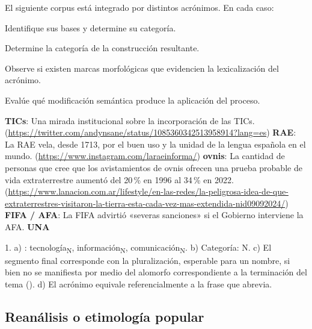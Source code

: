 \begin{ejercicio}\label{ej:04-acronimos}
El siguiente corpus está integrado por distintos acrónimos. En cada caso:

\begin{consignas}
  \item Identifique sus bases y determine su categoría.
  \item Determine la categoría de la construcción resultante.
  \item Observe si existen marcas morfológicas que evidencien la lexicalización
        del acrónimo.
  \item Evalúe qué modificación semántica produce la aplicación del proceso.
\end{consignas}

\begin{exe}
  \ex \textbf{TICs}: Una mirada institucional sobre la incorporación de las TICs.
      (\url{https://twitter.com/andynsane/status/1085360342513958914?lang=es})
  \ex \textbf{RAE}: La RAE vela, desde 1713, por el buen uso y la unidad de la
      lengua española en el mundo. (\url{https://www.instagram.com/laraeinforma/})
  \ex \textbf{ovnis}: La cantidad de personas que cree que los avistamientos de
      ovnis ofrecen una prueba probable de vida extraterrestre aumentó del 20\,\%
      en 1996 al 34\,\% en 2022.
      (\url{https://www.lanacion.com.ar/lifestyle/en-las-redes/la-peligrosa-idea-de-que-extraterrestres-visitaron-la-tierra-esta-cada-vez-mas-extendida-nid09092024/})
  \ex \textbf{FIFA / AFA}: La FIFA advirtió «severas sanciones» si el Gobierno
      interviene la AFA.
  \ex \textbf{UNA}
\end{exe}

\begin{resuelto}
1. a) : tecnología\textsubscript{N}, información\textsubscript{N},
comunicación\textsubscript{N}. b) Categoría: N. c) El segmento final corresponde
con la pluralización, esperable para un nombre, si bien no se manifiesta por
medio del alomorfo correspondiente a la terminación del tema (). d)
El acrónimo equivale referencialmente a la frase que abrevia.
\end{resuelto}
\end{ejercicio}

\subsection{Reanálisis o etimología popular}

